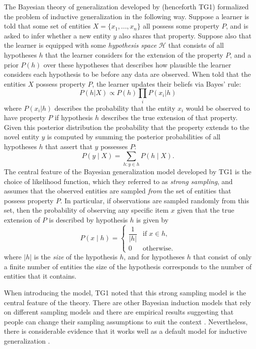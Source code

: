\documentclass[doc,floatsintext]{apa6}
\providecommand{\vbars}[1]{\lvert#1\rvert}
\begin{document}
The Bayesian theory of generalization developed by  (henceforth TG1) formalized the problem of inductive generalization in the following way. Suppose a learner is told that some set of entities $X = \lbrace x_1,. . ., x_n \rbrace$ all possess some property $P$, and is asked to infer whether a new entity $y$ also shares that property. Suppose also that the learner is equipped with some {\it hypothesis space} $\mathcal{H}$ that consists of all hypotheses $h$ that the learner considers for the extension of the property $P$, and a prior $P(h)$ over these hypotheses that describes how plausible the learner considers each hypothesis to be before any data are observed. When told that the entities $X$ possess property $P$, the learner updates their beliefs via Bayes' rule:
$$
P(h | X) \propto P(h) \prod_{i} P(x_i | h)
$$
where $P(x_i | h)$ describes the probability that the entity $x_i$ would be observed to have property $P$ if hypothesis $h$ describes the true extension of that property. Given this posterior distribution the probability that the property extends to the novel entity $y$ is computed by summing the posterior probabilities of all hypotheses $h$ that assert that $y$ possesses $P$:
\begin{equation}
\label{eq:generalization}
P(y \mid X) = \sum_{h:y \in h} P(h \mid X).
\end{equation}
The central feature of the Bayesian generalization model developed by TG1 is the choice of likelihood function, which they referred to as {\it strong sampling}, and assumes that the observed entities are sampled {\it from} the set of entities that possess property $P$. In particular, if observations are sampled randomly from this set, then the probability of observing any specific item $x$ given that the true extension of $P$ is described by hypothesis $h$ is given by
\begin{equation}
P(x \mid h) = \begin{cases}
 \dfrac{1}{\vbars{h}} & \text{if $x\in h$},\\
 0& \text{otherwise}.
\end{cases}
\end{equation}
where $\vbars{h}$ is the {\it size} of the hypothesis $h$, and for hypotheses $h$ that consist of only a finite number of entities the size of the hypothesis corresponds to the number of entities that it contains.

When introducing the model, TG1 noted that this strong sampling model is the central feature of the theory. There are other Bayesian induction models that rely on different sampling models \cite{heit_bayesian_1998,VoorspoelsINPRESS,navarro2012} and there are empirical results suggesting that people can change their sampling assumptions to suit the context \cite{RansomINPRESS,VoorspoelsINPRESS,gweon_infants_2010}. Nevertheless, there is considerable evidence that it works well as a default model for inductive generalization \cite{sanjana_bayesian_2003}.
\end{document}
